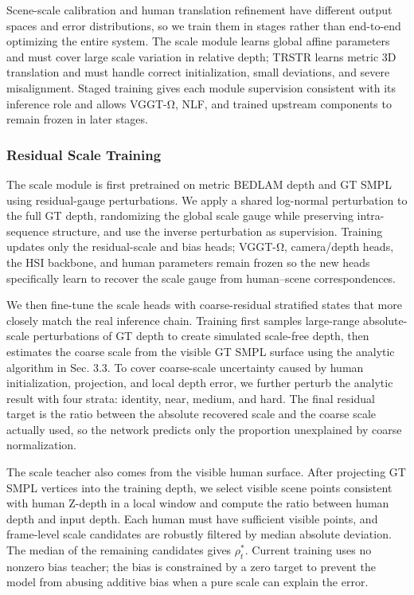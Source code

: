 \documentclass{article}
\begin{document}
Scene-scale calibration and human translation refinement have different output spaces and error distributions, so we train them in stages rather than end-to-end optimizing the entire system. The scale module learns global affine parameters and must cover large scale variation in relative depth; TRSTR learns metric 3D translation and must handle correct initialization, small deviations, and severe misalignment. Staged training gives each module supervision consistent with its inference role and allows VGGT-Ω, NLF, and trained upstream components to remain frozen in later stages.

\subsubsection{Residual Scale Training}

The scale module is first pretrained on metric BEDLAM depth and GT SMPL using residual-gauge perturbations. We apply a shared log-normal perturbation to the full GT depth, randomizing the global scale gauge while preserving intra-sequence structure, and use the inverse perturbation as supervision. Training updates only the residual-scale and bias heads; VGGT-Ω, camera/depth heads, the HSI backbone, and human parameters remain frozen so the new heads specifically learn to recover the scale gauge from human--scene correspondences.

We then fine-tune the scale heads with coarse-residual stratified states that more closely match the real inference chain. Training first samples large-range absolute-scale perturbations of GT depth to create simulated scale-free depth, then estimates the coarse scale from the visible GT SMPL surface using the analytic algorithm in Sec. 3.3. To cover coarse-scale uncertainty caused by human initialization, projection, and local depth error, we further perturb the analytic result with four strata: identity, near, medium, and hard. The final residual target is the ratio between the absolute recovered scale and the coarse scale actually used, so the network predicts only the proportion unexplained by coarse normalization.

The scale teacher also comes from the visible human surface. After projecting GT SMPL vertices into the training depth, we select visible scene points consistent with human Z-depth in a local window and compute the ratio between human depth and input depth. Each human must have sufficient visible points, and frame-level scale candidates are robustly filtered by median absolute deviation. The median of the remaining candidates gives $\rho_t^*$. Current training uses no nonzero bias teacher; the bias is constrained by a zero target to prevent the model from abusing additive bias when a pure scale can explain the error.
\end{document}

